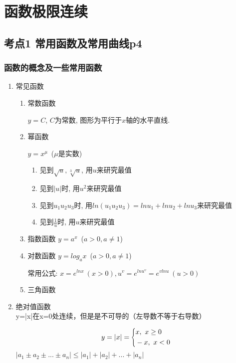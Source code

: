 \chapter{函数极限连续}
\section{考点1 常用函数及常用曲线p4}
\subsection{函数的概念及一些常用函数}
\begin{enumerate}
    \item 常见函数
    \begin{enumerate}
        \item 常数函数\par
        $ y=C $, $ C $为常数, 图形为平行于$ x $轴的水平直线.
        \item 幂函数\par
        $ y=x^{\mu} $\ ($ \mu $是实数)
        \begin{tcolorbox}
        \begin{enumerate}
        \item 见到$ \sqrt{u},\sqrt[3]{u} $, 用$ u $来研究最值
        \item 见到$ |u| $时, 用$ u^{2} $来研究最值
        \item 见到$ u_{1}u_{2}u_{3} $时, 用$ ln(u_{1}u_{2}u_{3})=lnu_{1}+lnu_{2}+lnu_{3} $来研究最值
        \item 见到$ \frac{1}{u} $时, 用$ u $来研究最值
        \end{enumerate}
        \end{tcolorbox}
        \item 指数函数
        $ y=a^{x} $\ ($ a>0,a\neq 1 $)
        \item 对数函数
        $ y=log_{a}x $\ ($ a>0,a\neq 1 $)
        \begin{tcolorbox}
        常用公式: $ x=e^{lnx}\ (x>0), u^{v}=e^{lnu^{v}}=e^{vlnu}\ (u>0) $
        \end{tcolorbox}
        \item 三角函数
    \end{enumerate}
    \item 绝对值函数\\
    y=|x|在x=0处连续，但是是不可导的（左导数不等于右导数）\par
        \begin{equation*}
        y=|x|=
        \scaleleftright[6pt]{\biggl\{}{
        \begin{aligned}
        & x,\ x\ge 0 \\
        & -x,\ x<0
        \end{aligned}
        }{.}
        \end{equation*}
    $|a_1 \pm a_2 \pm... \pm a_n|\le|a_1|+|a_2|+...+|a_n|$


\end{enumerate}
